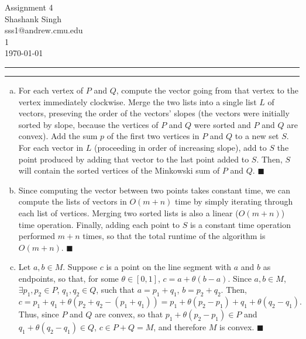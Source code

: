 \documentclass[11pt]{article}
\makeatletter
\newcounter{questionCounter}
\newcounter{partCounter}[questionCounter]
\newenvironment{question}[2][\arabic{questionCounter}]{%
    \setcounter{partCounter}{0}%
    \vspace{.25in} \hrule \vspace{0.5em}%
        \noindent{\bf #2}%
    \vspace{0.8em} \hrule \vspace{.10in}%
    \addtocounter{questionCounter}{1}%
}{}
\newcommand{\myname}{Shashank Singh}
\newcommand{\myandrew}{sss1@andrew.cmu.edu}
\newcommand{\myhwname}{Assignment 4}
\newcommand{\myrecitation}{1}
\makeatother
\begin{document}
\thispagestyle{plain}

\begin{center}
{\Large \myhwname} \\
\myname \\
\myandrew \\
\myrecitation \\
\today
\end{center}
\begin{question}{Minkowski set}
\begin{enumerate}[(a)]
\item For each vertex of $P$ and $Q$, compute the vector going from
that vertex to the vertex immediately clockwise. Merge the two lists
into a single list $L$ of vectors, preseving the order of the vectors' slopes
(the vectors were initially sorted by slope, because the vertices of $P$ and
$Q$ were sorted and $P$ and $Q$ are convex). Add the sum $p$ of the first two
vertices in $P$ and $Q$ to a new set $S$. For each vector in $L$ (proceeding
in order of increasing slope), add to $S$ the point produced by adding that
vector to the last point added to $S$. Then, $S$ will contain the sorted
vertices of the Minkowski sum of $P$ and $Q$. \qquad $\blacksquare$

\item Since computing the vector between two points takes constant time,
we can compute the lists of vectors in $O(m + n)$ time by simply iterating
through each list of vertices. Merging two sorted lists is also a linear
($O(m + n)$) time operation. Finally, adding each point to $S$ is a constant
time operation performed $m + n$ times, so that the total runtime of the
algorithm is $O(m + n)$. \qquad $\blacksquare$

\item Let $a,b \in M$. Suppose $c$ is a point on the line segment with $a$ and
$b$ as endpoints, so that, for some $\theta \in [0,1]$,
$c = a + \theta(b - a)$. Since $a,b \in M$, $\exists p_1,p_2 \in P$,
$q_1,q_2 \in Q$, such that $a = p_1 + q_1$, $b = p_2 + q_2$. Then,
\[c
 = p_1 + q_1 + \theta(p_2 + q_2 - (p_1 + q_1))
 = p_1 + \theta(p_2 - p_1) + q_1 + \theta(q_2 - q_1).
\]
Thus, since $P$ and $Q$ are convex, so that $p_1 + \theta(p_2 - p_1) \in P$
and $q_1 + \theta(q_2 - q_1) \in Q$, $c \in P + Q = M$, and therefore $M$ is
convex. \qquad $\blacksquare$
\end{enumerate}

\end{question}
\end{document}
